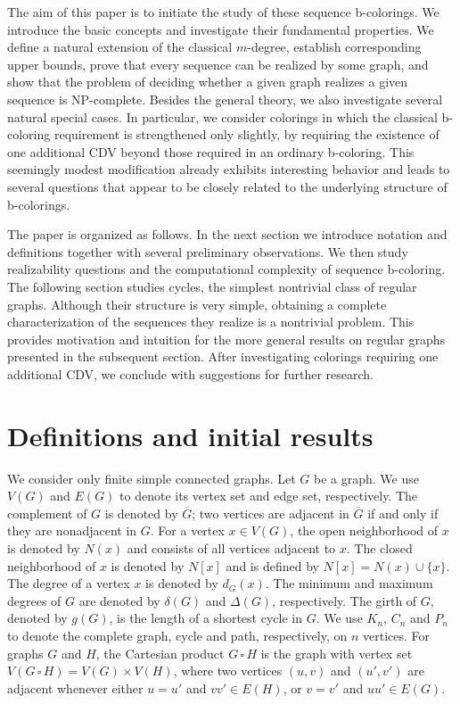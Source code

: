 \documentclass{article}
\newcommand{\cp}{\, \square \,}
\theoremstyle{definition}
\begin{document}
The aim of this paper is to initiate the study of these sequence b-colorings. We introduce the basic concepts and investigate their fundamental properties. We define a natural extension of the classical $m$-degree, establish corresponding upper bounds, prove that every sequence can be realized by some graph, and show that the problem of deciding whether a given graph realizes a given sequence is NP-complete. Besides the general theory, we also investigate several natural special cases. In particular, we consider colorings in which the classical b-coloring requirement is strengthened only slightly, by requiring the existence of one additional CDV beyond those required in an ordinary b-coloring. This seemingly modest modification already exhibits interesting behavior and leads to several questions that appear to be closely related to the underlying structure of b-colorings.

The paper is organized as follows. In the next section we introduce notation and definitions together with several preliminary observations. We then study realizability questions and the computational complexity of sequence b-coloring. The following section studies cycles, the simplest nontrivial class of regular graphs. Although their structure is very simple, obtaining a complete characterization of the sequences they realize is a nontrivial problem. This provides motivation and intuition for the more general results on regular graphs presented in the subsequent section. After investigating colorings requiring one additional CDV, we conclude with suggestions for further research.

\section{Definitions and initial results}\label{s:defs}

We consider only finite simple connected graphs. Let $G$ be a graph. We use $V(G)$ and $E(G)$ to denote its vertex set and edge set, respectively. The complement of $G$ is denoted by $\overline{G}$; two vertices are adjacent in $\overline{G}$ if and only if they are nonadjacent in $G$. For a vertex $x\in V(G)$, the open neighborhood of $x$ is denoted by $N(x)$ and consists of all vertices adjacent to $x$. The closed neighborhood of $x$ is denoted by $N[x]$ and is defined by $N[x]=N(x)\cup\{x\}$.
The degree of a vertex $x$ is denoted by $d_G(x)$.
The minimum and maximum degrees of $G$ are denoted by $\delta(G)$ and $\Delta(G)$, respectively. The girth of $G$, denoted by $g(G)$, is the length of a shortest cycle in $G$.
We use $K_n$, $C_n$ and $P_n$ to denote the complete graph, cycle and path, respectively, on $n$ vertices.
For graphs $G$ and $H$, the Cartesian product $G\cp H$ is the graph with vertex set $V(G\cp H)=V(G)\times V(H)$, where two vertices $(u,v)$ and $(u',v')$ are adjacent whenever either $u=u'$ and $vv'\in E(H)$, or $v=v'$ and $uu'\in E(G)$.
\end{document}
